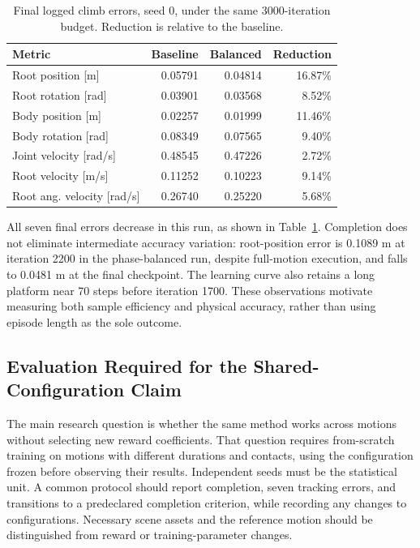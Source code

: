 \documentclass[letterpaper,10pt,conference]{ieeeconf}
\begin{document}
\begin{table}[t]
\caption{Final logged climb errors, seed 0, under the same 3000-iteration
budget. Reduction is relative to the baseline.}
\label{tab:climb}
\centering
\footnotesize
\setlength{\tabcolsep}{3pt}
\begin{tabular}{lrrr}
\toprule
Metric & Baseline & Balanced & Reduction \\
\midrule
Root position [m] & 0.05791 & 0.04814 & 16.87\% \\
Root rotation [rad] & 0.03901 & 0.03568 & 8.52\% \\
Body position [m] & 0.02257 & 0.01999 & 11.46\% \\
Body rotation [rad] & 0.08349 & 0.07565 & 9.40\% \\
Joint velocity [rad/s] & 0.48545 & 0.47226 & 2.72\% \\
Root velocity [m/s] & 0.11252 & 0.10223 & 9.14\% \\
Root ang. velocity [rad/s] & 0.26740 & 0.25220 & 5.68\% \\
\bottomrule
\end{tabular}
\end{table}

All seven final errors decrease in this run, as shown in
Table~\ref{tab:climb}. Completion does not eliminate intermediate accuracy
variation: root-position error is 0.1089 m at iteration 2200 in the
phase-balanced run, despite full-motion execution, and falls to 0.0481 m
at the final checkpoint. The learning curve also retains a long platform
near 70 steps before iteration 1700. These observations motivate measuring
both sample efficiency and physical accuracy, rather than using episode
length as the sole outcome.

\subsection{Evaluation Required for the Shared-Configuration Claim}
The main research question is whether the same method works across motions
without selecting new reward coefficients. That question requires
from-scratch training on motions with different durations and contacts,
using the configuration frozen before observing their results. Independent
seeds must be the statistical unit. A common protocol should report
completion, seven tracking errors, and transitions to a predeclared
completion criterion, while recording any changes to configurations.
Necessary scene assets and the reference motion should be distinguished
from reward or training-parameter changes.
\end{document}
